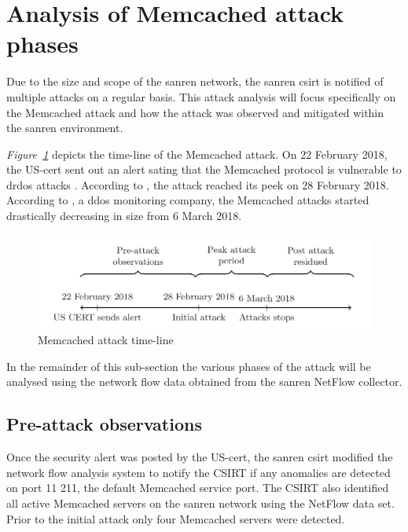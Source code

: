 \section{Analysis of Memcached attack phases}
\label{sec4}

Due to the size and scope of the \gls{sanren} network, the \gls{sanren} \gls{csirt} is notified of multiple attacks on a regular basis. This attack analysis will focus specifically on the Memcached attack and how the attack was  observed and mitigated within the \gls{sanren} environment.



\textit{Figure~\ref{fig:time_line}} depicts the time-line of the Memcached attack. On 22 February 2018, the US-\gls{cert} sent out an alert sating that the Memcached protocol is vulnerable to \gls{drdos} attacks   \cite{USCert2018}. According to \cite{Akamai2018Memcached}, the attack reached its peek on 28 February 2018. According to \cite{DDoSMon}, a \gls{ddos} monitoring company, the Memcached attacks started drastically decreasing in size from 6 March 2018.

\begin{figure}[h]
    \centering
    \includegraphics[width=\columnwidth]{section_4/memcached_phases.JPG}
    \caption{Memcached attack time-line}
    \label{fig:time_line}
\end{figure}

In the remainder of this sub-section the various phases of the attack will be analysed using the network flow data obtained from the \gls{sanren} NetFlow collector.

\subsection{Pre-attack observations}
\label{sub-pre-attack}

Once the security alert was posted by the US-\gls{cert}, the \gls{sanren} \gls{csirt} modified the network flow analysis system to notify the CSIRT if any anomalies are detected on port 11 211, the default Memcached service port. The CSIRT also identified all active Memcached servers on the \gls{sanren} network using the NetFlow data set. Prior to the initial attack only four Memcached servers were detected.



